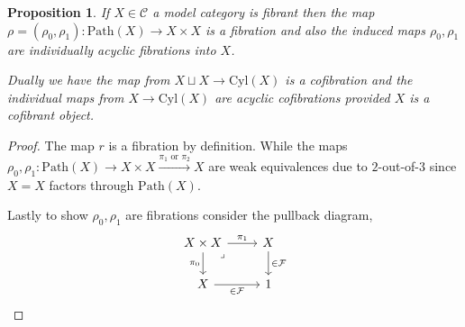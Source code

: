 \documentclass[12pt]{report}
\numberwithin{equation}{section}
\newtheorem{proposition}[dummy]{Proposition}
\begin{document}
	\begin{proposition}\label{prop-fib-acycfib}
		If $X \in \mathcal{C}$ a model category is fibrant then the map $\rho=(\rho_0, \rho_1): \mathrm{Path}(X) \to X \times X$ is a fibration and also the induced maps  $\rho_0, \rho_1$ are individually acyclic fibrations into $X$.
		
		Dually we have the map from $X \sqcup X \to \mathrm{Cyl}(X)$ is a cofibration and the individual maps from $X \to \mathrm{Cyl}(X)$ are acyclic cofibrations provided $X$ is a cofibrant object.
	\end{proposition}
	\begin{proof}
		The map $r$	is a fibration by definition. While the maps $\rho_0,\rho_1: \mathrm{Path}(X) \to X \times X \xrightarrow{\pi_1 \text{ or }\pi_2}X$ are weak equivalences due to $2$-out-of-$3$ since $X=X$ factors through $\mathrm{Path}(X)$.
		
		Lastly to show $\rho_0,\rho_1$ are fibrations consider the pullback diagram,
		\[\begin{tikzcd}
			{X\times X} & X \\
			X & 1
			\arrow["{\pi_1}", from=1-1, to=1-2]
			\arrow["{\pi_0}"', from=1-1, to=2-1]
			\arrow["\lrcorner"{anchor=center, pos=0.125}, draw=none, from=1-1, to=2-2]
			\arrow["{\in \mathcal{F}}", from=1-2, to=2-2]
			\arrow["{\in \mathcal{F}}"', from=2-1, to=2-2]
		\end{tikzcd}\]
	\end{proof}
	
\end{document}
